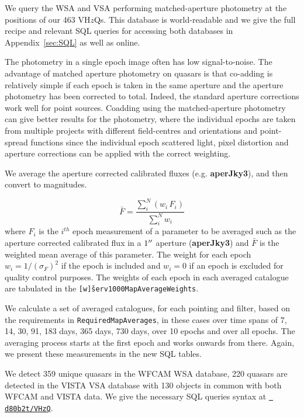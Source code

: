 \documentclass[usenatbib]{mnras}
\begin{document}
  We query the WSA and VSA performing matched-aperture photometry at
  the positions of our 463 VH$z$Qs. This database is world-readable and
  we give the full recipe and relevant SQL queries for accessing both
  databases in Appendix~\ref{sec:SQL} as well as online. 
  
  The photometry in a single epoch image often has low
  signal-to-noise.  The advantage of matched aperture photometry on
  quasars is that co-adding is relatively simple if each epoch is taken
  in the same aperture and the aperture photometry has been corrected to
  total. Indeed, the standard aperture corrections work well for point
  sources. Coadding using the matched-aperture photometry can give better results for the photometry, 
  where the individual epochs are taken from multiple projects with different field-centres and orientations and point-spread functions since the individual epoch scattered light, pixel distortion and aperture corrections can be applied with the correct weighting.
   
  We average the aperture corrected calibrated fluxes (e.g. {\bf
  aperJky3}), and then convert to magnitudes. 

  \begin{equation}
    \bar{F} = \frac{\sum_i^N (w_i\,F_i)}{\sum_i^N w_i}  
    \label{eq:avg}
  \end{equation}
  where $F_i$ is the $i^{th}$ epoch measurement of a parameter to be
  averaged such as the aperture corrected calibrated flux in a $1\hbox{$^{\prime\prime}$}$ aperture
  ({\bf aperJky3}) and $\bar{F}$ is the weighted mean average of this parameter.
  The weight for each epoch $w_i=1/(\sigma_{F})^2$ if the epoch is included and 
  $w_i=0$ if an epoch is excluded for quality control purposes. The weights of each epoch in each averaged catalogue are tabulated in the {\tt [w\v]serv1000MapAverageWeights}.
   
  We calculate a set of averaged catalogues, for each pointing and filter, based
  on the requirements in \verb+RequiredMapAverages+, in these cases over time
  spans of 7, 14, 30, 91, 183 days, 365 days, 730 days, over 10 epochs and
  over all epochs. The averaging process starts at the first epoch and works onwards 
  from there. Again, we present these measurements in the new SQL tables. 

  We detect 359 unique quasars in the WFCAM WSA database, 220 quasars
  are detected in the VISTA VSA database with 130 objects in common with
  both WFCAM and VISTA data.  We give the necessary SQL queries syntax
  at \href{https://github.com/d80b2t/VHzQ/blob/master/data/WSA_VSA/SAMPLE_SQL_QUERIES}{\tt
    d80b2t/VHzQ}.
  
\end{document}
